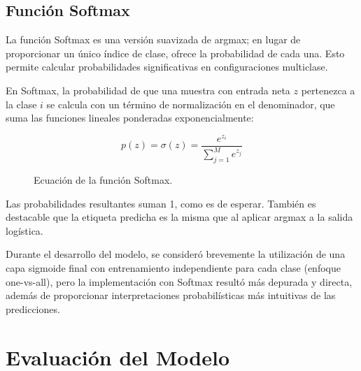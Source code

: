 \subsection{Función Softmax}
La función Softmax es una versión suavizada de argmax; en lugar de proporcionar un único índice de clase, ofrece la probabilidad de cada una. Esto permite calcular probabilidades significativas en configuraciones multiclase.

En Softmax, la probabilidad de que una muestra con entrada neta $z$ pertenezca a la clase $i$ se calcula con un término de normalización en el denominador, que suma las funciones lineales ponderadas exponencialmente:

\begin{figure}[h!]
    \centering
    \begin{equation}
        p(z) = \sigma(z) = \frac{e^{z_i}}{\sum_{j=1}^M e^{z_j}}
    \end{equation}
    \caption{Ecuación de la función Softmax.}
    \label{fig:softmax_equation}
\end{figure}

Las probabilidades resultantes suman 1, como es de esperar. También es destacable que la etiqueta predicha es la misma que al aplicar argmax a la salida logística.

Durante el desarrollo del modelo, se consideró brevemente la utilización de una capa sigmoide final con entrenamiento independiente para cada clase (enfoque one-vs-all), pero la implementación con Softmax resultó más depurada y directa, además de proporcionar interpretaciones probabilísticas más intuitivas de las predicciones.

\section{Evaluación del Modelo}

